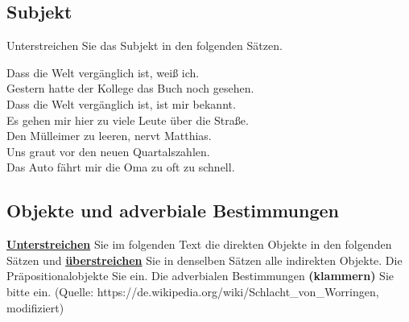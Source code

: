 \documentclass[12pt,a4paper,twoside]{article}
\newcommand*{\mybox}[1]{\framebox{#1}}
\newcommand\ol[1]{{\setul{-0.9em}{}\ul{#1}}}
\begin{document}
\subsection{Subjekt}

Unterstreichen Sie das Subjekt in den folgenden Sätzen.

\begin{exe}
  \setcounter{xnumi}{0}
  \ex Dass die Welt vergänglich ist, weiß ich.\\

  \ex Gestern hatte der Kollege das Buch noch gesehen.\\

  \ex Dass die Welt vergänglich ist, ist mir bekannt.\\

  \ex Es gehen mir hier zu viele Leute über die Straße.\\

  \ex Den Mülleimer zu leeren, nervt Matthias.\\

  \ex Uns graut vor den neuen Quartalszahlen.\\

  \ex Das Auto fährt mir die Oma zu oft zu schnell.\\

\end{exe}

\subsection{Objekte und adverbiale Bestimmungen}

\textbf{\ul{Unterstreichen}} Sie im folgenden Text die direkten Objekte in den folgenden Sätzen und \textbf{\ol{überstreichen}} Sie in denselben Sätzen alle indirekten Objekte. Die Präpositionalobjekte \textbf{\mybox{rahmen}} Sie ein.
Die adverbialen Bestimmungen \textbf{(klammern)} Sie bitte ein.
(Quelle: https://de.wikipedia.org/wiki/Schlacht\_von\_Worringen, modifiziert)
\end{document}
